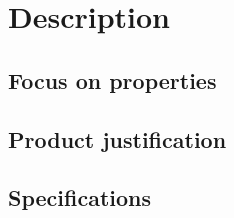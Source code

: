 \documentclass[../main.tex]{subfiles}
\begin{document}
\pagebreak
\section{Description}

    \subsection{Focus on properties}

    \subsection{Product justification}

    \subsection{Specifications}
\end{document}
